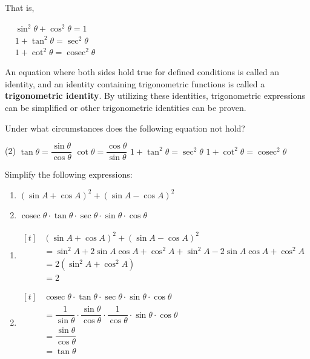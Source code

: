 \documentclass{report}
\begin{document}
\vspace{-4em}
\noindent That is,
\begin{info}
	
	$\begin{aligned} & \sin ^2 \theta+\cos ^2 \theta=1 \\ & 1+\tan ^2 \theta=\sec ^2 \theta \\ & 1+\cot ^2 \theta=\operatorname{cosec}^2 \theta\end{aligned}$
\end{info}

An equation where both sides hold true for defined conditions is called an identity, and an identity containing trigonometric functions is called a \textbf{trigonometric identity}. By utilizing these identities, trigonometric expressions can be simplified or other trigonometric identities can be proven.
\begin{think}
	
	\noindent Under what circumstances does the following equation not hold?
	\begin{tasks}[label=\arabic*.](2)
		\task $\tan \theta=\dfrac{\sin \theta}{\cos \theta}$
		\task $\cot \theta=\dfrac{\cos \theta}{\sin \theta}$
		\task $1+\tan ^2 \theta=\sec ^2 \theta$
		\task $1+\cot ^2 \theta=\operatorname{cosec}^2 \theta$
	\end{tasks}
\end{think}

\begin{question}
	Simplify the following expressions:
	\vspace{-1em}
	\begin{enumerate}[label=(\alph*)]
		\item $(\sin A+\cos A)^2+(\sin A-\cos A)^2$
		\item $\operatorname{cosec} \theta \cdot \tan \theta \cdot \sec \theta \cdot \sin \theta \cdot \cos \theta$
	\end{enumerate}
	
	\sol{}
	\vspace{-1em}
	\begin{enumerate}[label=(\alph*)]
		\item $\begin{aligned}[t] & (\sin A+\cos A)^2+(\sin A-\cos A)^2 \\ & =\sin ^2 A+2 \sin A \cos A+\cos ^2 A+\sin ^2 A-2 \sin A \cos A+\cos ^2 A \\ & =2\left(\sin ^2 A+\cos ^2 A\right) \\ & =2\end{aligned}$
		\item $\begin{aligned}[t] & \operatorname{cosec} \theta \cdot \tan \theta \cdot \sec \theta \cdot \sin \theta \cdot \cos \theta \\ & =\dfrac{1}{\sin \theta} \cdot \dfrac{\sin \theta}{\cos \theta} \cdot \dfrac{1}{\cos \theta} \cdot \sin \theta \cdot \cos \theta \\ & =\dfrac{\sin \theta}{\cos \theta} \\ & =\tan \theta\end{aligned}$
	\end{enumerate}
\end{question}
\end{document}
